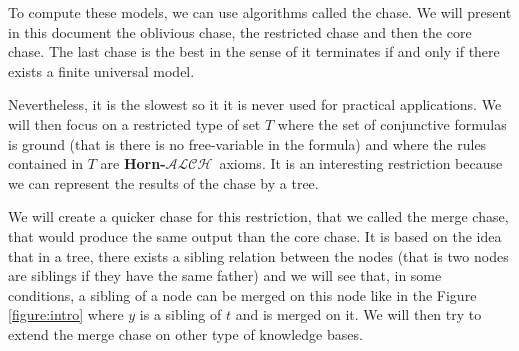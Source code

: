 \documentclass{article}
\theoremstyle{definition}
\theoremstyle{remark}
\newcommand{\ALCH}{\textbf{Horn-$\mathcal{ALCH}$}}
\begin{document}
To compute these models, we can use algorithms called the chase. We will present in this document the oblivious chase, the restricted chase and then the core chase. The last chase is the best in the sense of it terminates if and only if there exists a finite universal model. 

Nevertheless, it is the slowest so it it is never used for practical applications. We will then focus on a restricted type of set $T$ where the set of conjunctive formulas is ground (that is there is no free-variable in the formula) and where the rules contained in $T$ are \ALCH\ axioms. It is an interesting restriction because we can represent the results of the chase by a tree.

We will create a quicker chase for this restriction, that we called the merge chase, that would produce the same output than the core chase. It is based on the idea that in a tree, there exists a sibling relation between the nodes (that is two nodes are siblings if they have the same father) and we will see that, in some conditions, a sibling of a node can be merged on this node like in the Figure \ref{figure:intro} where $y$ is a sibling of $t$ and is merged on it. We will then try to extend the merge chase on other type of knowledge bases.
\end{document}
